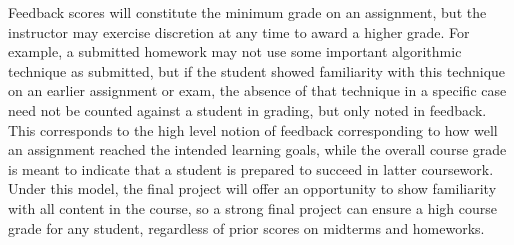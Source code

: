 \documentclass[11pt]{article}
\begin{document}
\noindent Feedback scores will constitute the minimum grade on an assignment, but the instructor
may exercise discretion at any time to award a higher grade. For example, a submitted homework
may not use some important algorithmic technique as submitted, but if the student showed familiarity
with this technique on an earlier assignment or exam, the absence of that technique in a specific
case need not be counted against a student in grading, but only noted in feedback. This corresponds to the high level notion of feedback corresponding to how well an assignment reached the intended learning goals, while the overall course grade is meant to indicate that a student is prepared to succeed in latter coursework. Under this model, the final project will offer an opportunity to show familiarity with all content in the course, so a strong final project can ensure a high course grade
for any student, regardless of prior scores on midterms and homeworks.
\end{document}
